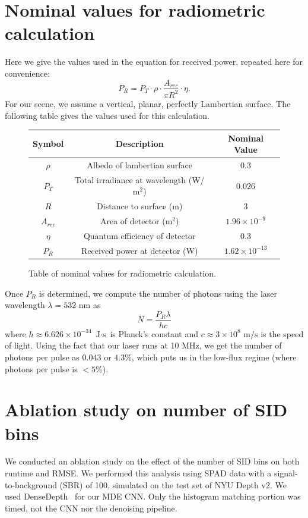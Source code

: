 \documentclass[runningheads]{llncs}
\begin{document}
\section{Nominal values for radiometric calculation}
Here we give the values used in the equation for received power, repeated here
for convenience:
  \begin{equation}
    P_R = P_T \cdot \rho \cdot \frac{A_{rec}}{\pi R^2} \cdot \eta.
  \end{equation}
  For our scene, we assume a vertical, planar, perfectly Lambertian surface. The following table gives the values used for this calculation.
\begin{figure}[H]
  \centering
  \begin{tabular}{c|c|c}
    \toprule
    Symbol & Description & Nominal Value \\
    \midrule
    $\rho$  & Albedo of lambertian surface & $0.3$ \\
    $P_T$ & Total irradiance at wavelength (W/$\text{m}^2$) & $0.026$ \\
    $R$ & Distance to surface (m) & $3$ \\
    $A_{rec}$ & Area of detector ($\text{m}^2$) & $1.96 \times 10^{-9}$ \\
    $\eta$ & Quantum efficiency of detector & $0.3$ \\
    $P_R$ & Received power at detector (W) & $1.62 \times 10^{-13}$ \\
    \bottomrule
  \end{tabular}
  \caption{Table of nominal values for radiometric calculation.}
  \label{fig:sbr_calculation}
\end{figure}
Once $P_R$ is determined, we compute the number of photons using the laser
wavelength $\lambda = 532$ nm as
\begin{equation}
  N = \frac{P_R\lambda}{hc}
\end{equation}
where $h \approx 6.626 \times 10^{-34}$ $\text{J} \cdot \text{s}$ is Planck's constant and $c \approx 3
\times 10^8$ $\text{m}/\text{s}$ is the speed of light. Using the fact that our laser runs at 10
MHz, we get the number of photons per pulse as $0.043$ or $4.3\%$, which puts us in the
low-flux regime (where photons per pulse is $< 5\%$).

\section{Ablation study on number of SID bins}
We conducted an ablation study on the effect of the number of SID bins
\cite{Fu2018} on both runtime and RMSE. We performed this analysis using SPAD
data with a signal-to-background (SBR) of 100, simulated on the test set of NYU
Depth v2. We used DenseDepth~\cite{Alhashim2018} for our MDE CNN.
Only the histogram matching portion was timed, not the CNN nor the
denoising pipeline.
\end{document}
